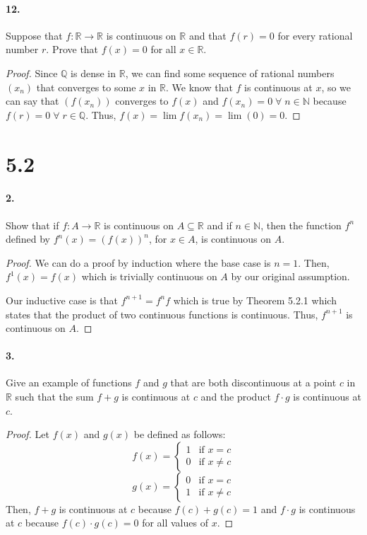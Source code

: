\documentclass[12pt]{article}
\newcommand\R{\mathbb{R}}
\newcommand\N{\mathbb{N}}
\newcommand\Q{\mathbb{Q}}
\theoremstyle{remark}
\begin{document}
\paragraph{12.} Suppose that $f: \mathbb{R} \rightarrow \mathbb{R}$ is continuous on $\mathbb{R}$ and that $f(r)=0$ for every rational number $r$. Prove that $f(x)=0$ for all $x \in \mathbb{R}$.
\begin{proof}
    Since $\Q$ is dense in $\R$, we can find some sequence of rational numbers $(x_n)$ that converges to some $x$ in $\R$. We know that $f$ is continuous at $x$, so we can say that $(f(x_n))$ converges to $f(x)$ and $f(x_n) = 0 \;\forall\; n \in \N$ because $f(r) = 0 \;\forall\; r \in \Q$. Thus, $f(x) = \lim f(x_n) = \lim(0) = 0$.
\end{proof}

\section*{5.2}
\paragraph{2.} Show that if $f: A \rightarrow \mathbb{R}$ is continuous on $A \subseteq \mathbb{R}$ and if $n \in \mathbb{N}$, then the function $f^n$ defined by $f^n(x)=(f(x))^n$, for $x \in A$, is continuous on $A$.
\begin{proof}
    We can do a proof by induction where the base case is $n = 1$. Then, $f^1(x) = f(x)$ which is trivially continuous on $A$ by our original assumption.
    
    Our inductive case is that $f^{n + 1} = f^n f$ which is true by Theorem 5.2.1 which states that the product of two continuous functions is continuous. Thus, $f^{n + 1}$ is continuous on $A$.
\end{proof}

\paragraph{3.} Give an example of functions $f$ and $g$ that are both discontinuous at a point $c$ in $\mathbb{R}$ such that the sum $f + g$ is continuous at $c$ and the product $f \cdot g$ is continuous at $c$.
\begin{proof}
    Let $f(x)$ and $g(x)$ be defined as follows:
    $$f(x) = \begin{cases}
        1 & \text{if } x = c \\
        0 & \text{if } x \neq c
    \end{cases}$$
    $$g(x) = \begin{cases}
        0 & \text{if } x = c \\
        1 & \text{if } x \neq c
    \end{cases}$$
    Then, $f + g$ is continuous at $c$ because $f(c) + g(c) = 1$ and $f \cdot g$ is continuous at $c$ because $f(c) \cdot g(c) = 0$ for all values of $x$.
\end{proof}
\end{document}
